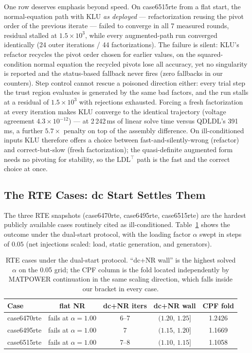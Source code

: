 \documentclass[11pt]{article}
\begin{document}
One row deserves emphasis beyond speed. On case6515rte from a flat start,
the normal-equation path with KLU \emph{as deployed} --- refactorization
reusing the pivot order of the previous iterate --- failed to converge in
all 7 measured rounds, residual stalled at $1.5\times10^{3}$, while every
augmented-path run converged identically (24 outer iterations / 44
factorizations). The failure is silent: KLU's refactor recycles the pivot
order chosen for earlier values, on the squared-condition normal equation
the recycled pivots lose all accuracy, yet no singularity is reported and
the status-based fallback never fires (zero fallbacks in our counters).
Step control cannot rescue a poisoned direction either: every trial step
the trust region evaluates is generated by the same bad factors, and the
run stalls at a residual of $1.5\times10^{3}$ with rejections exhausted.
Forcing a fresh factorization at every iteration makes KLU converge to the
identical trajectory (voltage agreement $4.3\times10^{-12}$) --- at
2\,242\,ms of linear solve time versus QDLDL's 391\,ms, a further
$5.7\times$ penalty on top of the assembly difference. On ill-conditioned
inputs KLU therefore offers a choice between fast-and-silently-wrong
(refactor) and correct-but-slow (fresh factorization); the quasi-definite
augmented form needs no pivoting for stability, so the LDL$^{\top}$ path
is the fast and the correct choice at once.

\subsection{The RTE Cases: dc Start Settles Them}

The three RTE snapshots (case6470rte, case6495rte, case6515rte) are the
hardest publicly available cases routinely cited as ill-conditioned.
Table~\ref{tab:rte} shows the outcome under the dual-start protocol, with
the loading factor $\alpha$ swept in steps of $0.05$ (net injections
scaled: load, static generation, and generators).

\begin{table}[h]
\centering
\caption{RTE cases under the dual-start protocol. ``dc+NR wall'' is the
highest solved $\alpha$ on the 0.05 grid; the CPF column is the fold
located independently by MATPOWER continuation in the same scaling
direction, which falls inside our bracket in every case.}
\label{tab:rte}
\begin{tabular}{lcccc}
\toprule
Case & flat NR & dc+NR iters & dc+NR wall & CPF fold \\
\midrule
case6470rte & fails at $\alpha=1.00$ & 6--7 & $(1.20,\,1.25]$ & 1.2426 \\
case6495rte & fails at $\alpha=1.00$ & 7    & $(1.15,\,1.20]$ & 1.1669 \\
case6515rte & fails at $\alpha=1.00$ & 7--8 & $(1.10,\,1.15]$ & 1.1058 \\
\bottomrule
\end{tabular}
\end{table}
\end{document}
